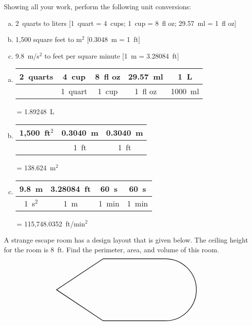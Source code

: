 \documentclass[12pt,letterpaper]{exam}
\begin{document}
\begin{questions}
\newpage
\question[10] Showing all your work, perform the following unit conversions:
	\begin{enumerate}[(a)]
	\item 2~quarts to liters [1~quart = 4~cups; 1~cup = 8~fl oz; 29.57~ml = 1~fl oz]
	\item 1,500 square feet to m$^2$ [0.3048~m = 1~ft]
	\item 9.8~m/s$^2$ to feet per square minute [1~m = 3.28084~ft]
	\end{enumerate} \pspace

\sol 
\begin{enumerate}[(a)]
\item \phantom{.}\par
	\begin{table}[H]
	\centering
	\begin{tabular}{c||c|c|c|c}
	2~quarts   & 4~cup  & 8~fl oz & 29.57~ml & 1~L \\ \hline
			& 1~quart & 1~cup & 1~fl oz & 1000~ml
	\end{tabular}\,= 1.89248~L
	\end{table} \pspace

\item \phantom{.}\par
	\begin{table}[H]
	\centering
	\begin{tabular}{c||c|c}
	1,500~ft$^2$ & 0.3040~m & 0.3040~m \\ \hline
				& 1~ft & 1~ft
	\end{tabular}\,= 138.624~m$^2$
	\end{table} \pspace

\item \phantom{.}\par
	\begin{table}[H]
	\centering
	\begin{tabular}{c||c|c|c}
	9.8~m & 3.28084~ft & 60~s & 60~s \\ \hline
	1~s$^2$ & 1~m & 1~min & 1~min
	\end{tabular}\,= 115,748.0352~ft/min$^2$
	\end{table} 
\end{enumerate}



\newpage
\question[10] A strange escape room has a design layout that is given below. The ceiling height for the room is 8~ft. Find the perimeter, area, and volume of this room.
	\[
	\begin{tikzpicture}[scale=0.8]
	\draw[line width=0.03cm] (4,-2) -- (0,-2) -- (-3,0) -- (0,2) -- (4,2);
	\draw[line width=0.03cm] (4,-2) arc(-90:90:2);
	

\end{tikzpicture}\]
\end{questions}
\end{document}
